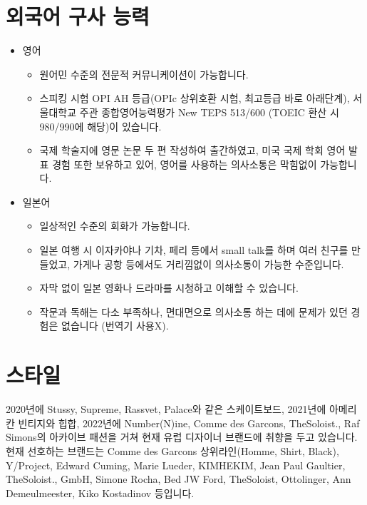 \section*{외국어 구사 능력}
\begin{itemize}
    \item 영어
          \begin{itemize}
              \item 원어민 수준의 전문적 커뮤니케이션이 가능합니다.
              \item 스피킹 시험 OPI AH 등급(OPIc 상위호환 시험, 최고등급 바로 아래단계), 서울대학교 주관 종합영어능력평가 New TEPS 513/600 (TOEIC 환산 시 980/990에 해당)이 있습니다.
              \item 국제 학술지에 영문 논문 두 편 작성하여 출간하였고, 미국 국제 학회 영어 발표 경험 또한 보유하고 있어, 영어를 사용하는 의사소통은 막힘없이 가능합니다.
          \end{itemize}
    \item 일본어
          \begin{itemize}
              \item 일상적인 수준의 회화가 가능합니다.
              \item 일본 여행 시 이자카야나 기차, 페리 등에서 small talk를 하며 여러 친구를 만들었고, 가게나 공항 등에서도 거리낌없이 의사소통이 가능한 수준입니다.
              \item 자막 없이 일본 영화나 드라마를 시청하고 이해할 수 있습니다.
              \item 작문과 독해는 다소 부족하나, 면대면으로 의사소통 하는 데에 문제가 있던 경험은 없습니다 (번역기 사용X).
          \end{itemize}
\end{itemize}

\section*{스타일}
2020년에 Stussy, Supreme, Rassvet, Palace와 같은 스케이트보드, 2021년에 아메리칸 빈티지와 힙합, 2022년에 Number(N)ine, Comme des Garcons, TheSoloist., Raf Simons의 아카이브 패션을 거쳐 현재 유럽 디자이너 브랜드에 취향을 두고 있습니다. 현재 선호하는 브랜드는 Comme des Garcons 상위라인(Homme, Shirt, Black), Y/Project, Edward Cuming, Marie Lueder, KIMHEKIM, Jean Paul Gaultier, TheSoloist., GmbH, Simone Rocha, Bed JW Ford, TheSoloist, Ottolinger, Ann Demeulmeester, Kiko Kostadinov 등입니다.

